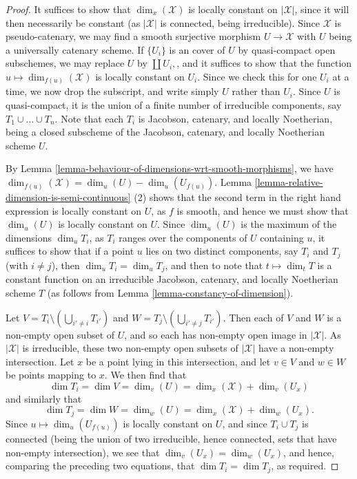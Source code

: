 \documentclass[10pt,a4paper]{amsart}
\theoremstyle{plain}
\theoremstyle{definition}
\theoremstyle{remark}
\numberwithin{equation}{subsection}
\begin{document}
\begin{proof}
It suffices to show that $\dim_x(\mathcal{X})$ is locally constant on
$|\mathcal{X}|$,
since it will then necessarily be constant (as $|\mathcal{X}|$ is connected,
being irreducible).  Since $\mathcal{X}$ is pseudo-catenary,
we may find a smooth surjective morphism $U \to \mathcal{X}$ with $U$
being a universally catenary scheme.  If $\{U_i\}$ is an
cover of $U$ by quasi-compact open subschemes, we may replace
$U$ by $\coprod U_i,$, and
it suffices to show that
the function $u \mapsto \dim_{f(u)}(\mathcal{X})$ is locally constant on $U_i$.
Since we check this for one $U_i$ at a time, we now drop the subscript,
and write simply $U$ rather than $U_i$.
Since $U$ is quasi-compact, it
is the union of a finite number of irreducible components,
say $T_1 \cup \ldots \cup T_n$.  Note that each $T_i$ is Jacobson,
catenary, and locally Noetherian,
being a closed subscheme of the Jacobson, catenary, and locally Noetherian
scheme $U$.

\medskip\noindent
By Lemma \ref{lemma-behaviour-of-dimensions-wrt-smooth-morphisms}, we have
$\dim_{f(u)}(\mathcal{X}) = \dim_{u}(U) - \dim_{u}(U_{f(u)}).$
Lemma \ref{lemma-relative-dimension-is-semi-continuous} (2)
shows that the second term in the right hand expression is locally
constant on $U$, as $f$ is smooth,
and hence we must show that $\dim_u(U)$
is locally constant on $U$.  Since $\dim_u(U)$ is the maximum
of the dimensions $\dim_u T_i$, as $T_i$ ranges over the components
of $U$ containing $u$, it suffices to show
that if a point $u$ lies on two distinct components,
say $T_i$ and $T_j$ (with $i \neq j$),
then $\dim_u T_i = \dim_u T_j$,
and then to note that $t\mapsto \dim_t T$ is a constant
function on an irreducible Jacobson,
catenary, and locally Noetherian scheme $T$
(as follows from Lemma \ref{lemma-constancy-of-dimension}).

\medskip\noindent
Let $V = T_i \setminus (\bigcup_{i' \neq i} T_{i'})$
and $W = T_j \setminus (\bigcup_{i' \neq j} T_{i'})$.
Then each of $V$ and $W$ is a non-empty open subset of $U$,
and so each has non-empty open image in $|\mathcal{X}|$.  As $|\mathcal{X}|$ is
irreducible,
these two non-empty open subsets of $|\mathcal{X}|$ have a non-empty
intersection.
Let $x$ be a point lying in this intersection, and let $v \in V$ and
$w\in W$ be points mapping to $x$.
We then find that
$$
\dim T_i = \dim V = \dim_v (U) = \dim_x (\mathcal{X}) + \dim_v (U_x)
$$
and similarly that
$$
\dim T_j = \dim W = \dim_w (U) = \dim_x (\mathcal{X}) + \dim_w (U_x).
$$
Since $u \mapsto \dim_u (U_{f(u)})$ is locally constant on $U$,
and since $T_i \cup T_j$ is connected (being the union of two irreducible,
hence connected, sets that have non-empty intersection),
we see that $\dim_v (U_x) = \dim_w(U_x)$,
and hence, comparing the preceding two equations,
that $\dim T_i = \dim T_j$, as required.
\end{proof}
\end{document}
